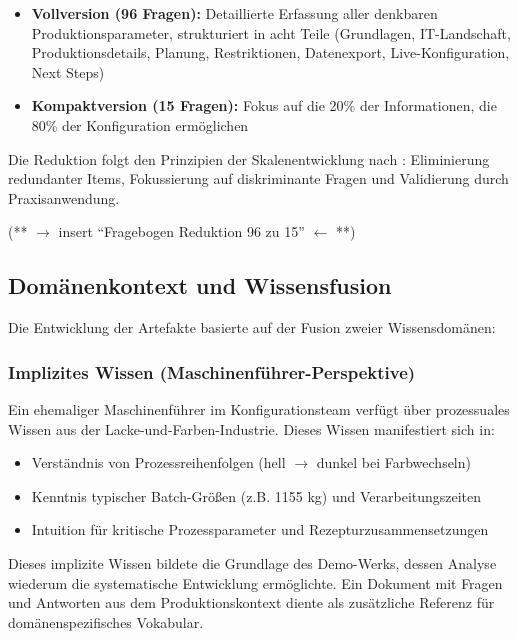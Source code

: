 \begin{itemize}
    \item \textbf{Vollversion (96 Fragen):} Detaillierte Erfassung aller denkbaren Produktionsparameter, strukturiert in acht Teile (Grundlagen, IT-Landschaft, Produktionsdetails, Planung, Restriktionen, Datenexport, Live-Konfiguration, Next Steps)
    \item \textbf{Kompaktversion (15 Fragen):} Fokus auf die 20\% der Informationen, die 80\% der Konfiguration ermöglichen
\end{itemize}

Die Reduktion folgt den Prinzipien der Skalenentwicklung nach \cite{devellis:scale_development2017}: Eliminierung redundanter Items, Fokussierung auf diskriminante Fragen und Validierung durch Praxisanwendung.

(** $\rightarrow$ insert ``Fragebogen Reduktion 96 zu 15'' $\leftarrow$ **)


\subsection{Domänenkontext und Wissensfusion}
\label{subsec:Domaenenkontext}

Die Entwicklung der Artefakte basierte auf der Fusion zweier Wissensdomänen:

\subsubsection{Implizites Wissen (Maschinenführer-Perspektive)}
\label{subsubsec:ImplizitesWissen}

Ein ehemaliger Maschinenführer im Konfigurationsteam verfügt über prozessuales Wissen aus der Lacke-und-Farben-Industrie. Dieses Wissen manifestiert sich in:

\begin{itemize}
    \item Verständnis von Prozessreihenfolgen (hell $\rightarrow$ dunkel bei Farbwechseln)
    \item Kenntnis typischer Batch-Größen (z.B. 1155 kg) und Verarbeitungszeiten
    \item Intuition für kritische Prozessparameter und Rezepturzusammensetzungen
\end{itemize}

Dieses implizite Wissen bildete die Grundlage des Demo-Werks, dessen Analyse wiederum die systematische Entwicklung ermöglichte. Ein Dokument mit Fragen und Antworten aus dem Produktionskontext diente als zusätzliche Referenz für domänenspezifisches Vokabular.


